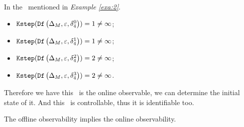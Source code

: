 \begin{example}
In the \BCN\ mentioned in {\em Example \ref{exa:2}}.  
 \begin{itemize}
 \item ${\tt Kstep}({\tt Df}\left(\Delta_M,\varepsilon, \delta_{4}^0\right))=1\ne \infty$;
 \item ${\tt Kstep}({\tt Df}\left(\Delta_M,\varepsilon, \delta_{4}^1\right))=1\ne \infty$;
 \item ${\tt Kstep}({\tt Df}\left(\Delta_M,\varepsilon, \delta_{4}^2\right))=2\ne \infty$;
 \item ${\tt Kstep}({\tt Df}\left(\Delta_M,\varepsilon, \delta_{4}^3\right))=2\ne \infty$.
 \end{itemize}
 
Therefore we have this \BCN\ is the online observable, we can determine the initial state of it. And this \BCN\ is controllable, thus it is identifiable too.  %
\label{exa:10}
\end{example}  



\begin{lemma}
The offline observability implies the online observability.
\label{lemm:4}
\end{lemma}



